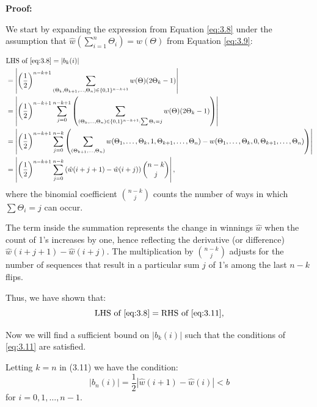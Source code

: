 \documentclass[11pt]{article}
\numberwithin{equation}{section}
\theoremstyle{boldStyle}
\begin{document}
\textbf{Proof:}

We start by expanding the expression from Equation \eqref{eq:3.8} under the assumption that $\hat{w} \left(\sum_{i=1}^n \Theta_i\right) = w(\Theta)$ from Equation \eqref{eq:3.9}:

\begin{align*}
    &\text{LHS of \eqref{eq:3.8}} = \left| b_k(i) \right| \\ 
    &= \left|\left(\frac{1}{2}\right)^{n-k+1} \sum_{(\Theta_k, \Theta_{k+1}, \ldots, \Theta_n) \in \{0,1\}^{n-k+1}} w(\Theta)(2\Theta_k - 1)\right| \\
    &= \left|\left(\frac{1}{2}\right)^{n-k+1} \sum_{j=0}^{n-k+1} \left(\sum_{(\Theta_k, \ldots, \Theta_n) \in \{0,1\}^{n-k+1} : \sum \Theta_i = j} w(\Theta) (2\Theta_k - 1)\right) \right| \\
    &= \left|\left(\frac{1}{2}\right)^{n-k+1} \sum_{j=0}^{n-k} \left( \sum_{(\Theta_{k+1}, \ldots, \Theta_n)} w(\Theta_1, \ldots, \Theta_k, 1, \Theta_{k+1}, \ldots, \Theta_n) - w(\Theta_1, \ldots, \Theta_k, 0, \Theta_{k+1}, \ldots, \Theta_n) \right) \right| \\
    &= \left|\left(\frac{1}{2}\right)^{n-k+1} \sum_{j=0}^{n-k} \left(\hat{w}(i+j+1) - \hat{w}(i+j)\right) \binom{n-k}{j}\right|,
\end{align*}
where the binomial coefficient $\binom{n-k}{j}$ counts the number of ways in which $\sum \Theta_i = j$ can occur.

The term inside the summation represents the change in winnings $\hat{w}$ when the count of 1's increases by one, hence reflecting the derivative (or difference) $\hat{w}(i+j+1) - \hat{w}(i+j)$. The multiplication by $\binom{n-k}{j}$ adjusts for the number of sequences that result in a particular sum $j$ of 1's among the last $n-k$ flips.

Thus, we have shown that:
\begin{equation*}
    \text{LHS of \eqref{eq:3.8}} = \text{RHS of \eqref{eq:3.11}},
\end{equation*}

\bigbreak

Now we will find a sufficient bound on $\left| b_k(i) \right|$ such that the conditions of \ref{eq:3.11} are satisfied.

Letting \(k = n\) in (3.11) we have the condition:
\begin{equation} \label{eq:3.12}
    \left |b_n(i) \right| = \frac{1}{2} \left| \hat{w}(i + 1) - \hat{w}(i)\right| < b
\end{equation}
for \(i = 0, 1, \ldots, n - 1\).
\end{document}
